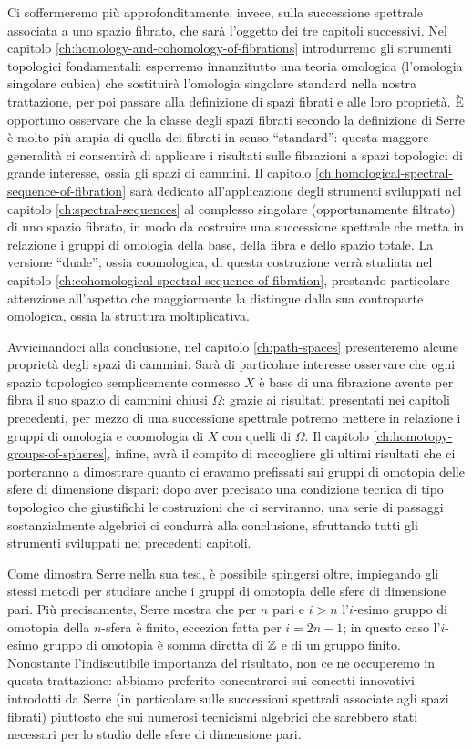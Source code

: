 Ci soffermeremo più approfonditamente, invece, sulla successione spettrale associata a uno spazio fibrato, che sarà l'oggetto dei tre capitoli successivi. Nel capitolo \ref{ch:homology-and-cohomology-of-fibrations} introdurremo gli strumenti topologici fondamentali: esporremo innanzitutto una teoria omologica (l'omologia singolare cubica) che sostituirà l'omologia singolare standard nella nostra trattazione, per poi passare alla definizione di spazi fibrati e alle loro proprietà. È opportuno osservare che la classe degli spazi fibrati secondo la definizione di Serre è molto più ampia di quella dei fibrati in senso \enquote{standard}: questa maggore generalità ci consentirà di applicare i risultati sulle fibrazioni a spazi topologici di grande interesse, ossia gli spazi di cammini. Il capitolo \ref{ch:homological-spectral-sequence-of-fibration} sarà dedicato all'applicazione degli strumenti sviluppati nel capitolo \ref{ch:spectral-sequences} al complesso singolare (opportunamente filtrato) di uno spazio fibrato, in modo da costruire una successione spettrale che metta in relazione i gruppi di omologia della base, della fibra e dello spazio totale. La versione \enquote{duale}, ossia coomologica, di questa costruzione verrà studiata nel capitolo \ref{ch:cohomological-spectral-sequence-of-fibration}, prestando particolare attenzione all'aspetto che maggiormente la distingue dalla sua controparte omologica, ossia la struttura moltiplicativa.

Avvicinandoci alla conclusione, nel capitolo \ref{ch:path-spaces} presenteremo alcune proprietà degli spazi di cammini. Sarà di particolare interesse osservare che ogni spazio topologico semplicemente connesso $X$ è base di una fibrazione avente per fibra il suo spazio di cammini chiusi $\Omega$: grazie ai risultati presentati nei capitoli precedenti, per mezzo di una successione spettrale potremo mettere in relazione i gruppi di omologia e coomologia di $X$ con quelli di $\Omega$. Il capitolo \ref{ch:homotopy-groups-of-spheres}, infine, avrà il compito di raccogliere gli ultimi risultati che ci porteranno a dimostrare quanto ci eravamo prefissati sui gruppi di omotopia delle sfere di dimensione dispari: dopo aver precisato una condizione tecnica di tipo topologico che giustifichi le costruzioni che ci serviranno, una serie di passaggi sostanzialmente algebrici ci condurrà alla conclusione, sfruttando tutti gli strumenti sviluppati nei precedenti capitoli.

Come dimostra Serre nella sua tesi, è possibile spingersi oltre, impiegando gli stessi metodi per studiare anche i gruppi di omotopia delle sfere di dimensione pari. Più precisamente, Serre mostra che per $n$ pari e $i>n$ l'$i$-esimo gruppo di omotopia della $n$-sfera è finito, eccezion fatta per $i=2n-1$; in questo caso l'$i$-esimo gruppo di omotopia è somma diretta di $\mathbb{Z}$ e di un gruppo finito. Nonostante l'indiscutibile importanza del risultato, non ce ne occuperemo in questa trattazione: abbiamo preferito concentrarci sui concetti innovativi introdotti da Serre (in particolare sulle successioni spettrali associate agli spazi fibrati) piuttosto che sui numerosi tecnicismi algebrici che sarebbero stati necessari per lo studio delle sfere di dimensione pari.
